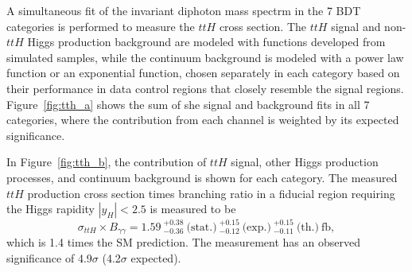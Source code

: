 \documentclass{moriond}
\begin{document}
A simultaneous fit of the invariant diphoton mass spectrm in the 7 BDT categories is performed to
measure the $ttH$ cross section. The $ttH$ signal and non-$ttH$ Higgs production background are
modeled with functions developed from simulated samples, while the continuum background is modeled
with a power law function or an exponential function, chosen separately in each category based on their
performance in data control regions that closely resemble the signal regions.
Figure~\ref{fig:tth_a} shows the sum of she signal and background fits in all 7 categories, where
the contribution from each channel is weighted by its expected significance.

In Figure~\ref{fig:tth_b}, the contribution of $ttH$ signal, other Higgs
production processes, and continuum background is shown for each category.
The measured $ttH$ production cross section times branching ratio in a fiducial region requiring the
Higgs rapidity $|y_H|<2.5$ is measured to be
%
\begin{equation}
\sigma_{ttH} \times B_{\gamma\gamma} = 1.59~^{+0.38}_{-0.36} ~\textrm{(stat.)}
~^{+0.15}_{-0.12} ~\textrm{(exp.)}
~^{+0.15}_{-0.11} ~\textrm{(th.)}~\textrm{fb},
\end{equation}
%
which is 1.4 times the SM prediction.
The measurement has an observed significance of 4.9$\sigma$ (4.2$\sigma$ expected).
\end{document}
